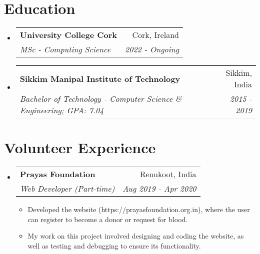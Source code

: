 \documentclass[a4paper,20pt]{article}
\makeatletter
\newcommand{\resumeItemWithoutTitle}[1]{
  \item\small{
    {#1\vspace{-2pt}}
  }
}
\newcommand{\resumeSubheading}[4]{
  \vspace{-1pt}\item
    \begin{tabular*}{0.97\textwidth}{l@{\extracolsep{\fill}}r}
      \textbf{#1} & #2 \\
      \textit{#3} & \textit{#4} \\
    \end{tabular*}\vspace{-5pt}
}
\newcommand{\resumeSubHeadingListStart}{\begin{itemize}[leftmargin=*]}
\newcommand{\resumeSubHeadingListEnd}{\end{itemize}}
\newcommand{\resumeItemListStart}{\begin{itemize}}
\newcommand{\resumeItemListEnd}{\end{itemize}\vspace{-5pt}}
\makeatother
\begin{document}
\section{Education}
\resumeSubHeadingListStart
\resumeSubheading
{University College Cork}{Cork, Ireland}
{MSc - Computing Science}{2022 - Ongoing}
\vspace{2pt}
\resumeSubheading
{Sikkim Manipal Institute of Technology}{Sikkim, India}
{Bachelor of Technology - Computer Science \& Engineering;  GPA: 7.04}{2015 - 2019}
\resumeSubHeadingListEnd
\vspace{-5pt}

\section{Volunteer Experience}
\resumeSubHeadingListStart
\resumeSubheading{Prayas Foundation}{Renukoot, India}
{Web Developer (Part-time)}{Aug 2019 - Apr 2020}
\resumeItemListStart
\resumeItemWithoutTitle{Developed the website (https://prayasfoundation.org.in), where the user can register to become a donor or request for blood.}
\resumeItemWithoutTitle{My work on this project involved designing and coding the website, as well as testing and debugging to ensure its functionality.}
\resumeItemListEnd
\resumeSubHeadingListEnd
\end{document}

